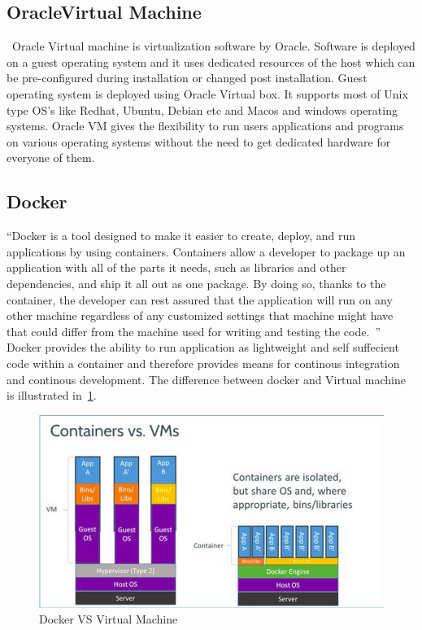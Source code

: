 \subsection{OracleVirtual Machine}
~\cite{hid-sp18-413-OracleVM}Oracle Virtual machine is virtualization
software by Oracle. Software is deployed on a guest operating system
and it uses dedicated resources of the host which can be
pre-configured during installation or changed post installation. Guest
operating system is deployed using Oracle Virtual box. It supports
most of Unix type OS's like Redhat, Ubuntu, Debian etc and Macos and
windows operating systems. Oracle VM gives the flexibility to run
users applications and programs on various operating systems without
the need to get dedicated hardware for everyone of them.

\subsection{Docker}

``Docker is a tool designed to make it easier to create, deploy, and
run applications by using containers. Containers allow a developer to
package up an application with all of the parts it needs, such as
libraries and other dependencies, and ship it all out as one
package. By doing so, thanks to the container, the developer can rest
assured that the application will run on any other machine regardless
of any customized settings that machine might have that could differ
from the machine used for writing and testing the
code.~\cite{hid-sp18-413-docker}'' Docker provides the ability to run
application as lightweight and self suffecient code within a container
and therefore provides means for continous integration and continous
development. The difference between docker and Virtual machine is
illustrated in~\ref{f:contvsvm}.

\begin{figure}[!ht]
	\centering\includegraphics[width=\columnwidth]{images/dockervsvm.png}
	 \caption{Docker VS Virtual Machine}\label{f:contvsvm}
\end{figure}

